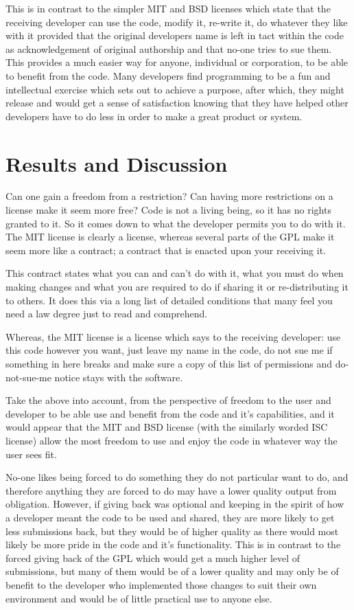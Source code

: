 This is in contrast to the simpler MIT and BSD licenses which state that the receiving developer can use the code, modify it, re-write it, do whatever they like with it provided that the original developers name is left in tact within the code as acknowledgement of original authorship and that no-one tries to sue them. This provides a much easier way for anyone, individual or corporation, to be able to benefit from the code. Many developers find programming to be a fun and intellectual exercise which sets out to achieve a purpose, after which, they might release and would get a sense of satisfaction knowing that they have helped other developers have to do less in order to make a great product or system.

\section{Results and Discussion}
Can one gain a freedom from a restriction? Can having more restrictions on a license make it seem more free? Code is not a living being, so it has no rights granted to it. So it comes down to what the developer permits you to do with it. The MIT license is clearly a license, whereas several parts of the GPL make it seem more like a contract; a contract that is enacted upon your receiving it.

This contract states what you can and can't do with it, what you must do when making changes and what you are required to do if sharing it or re-distributing it to others. It does this via a long list of detailed conditions that many feel you need a law degree just to read and comprehend.

Whereas, the MIT license is a license which says to the receiving developer: use this code however you want, just leave my name in the code, do not sue me if something in here breaks and make sure a copy of this list of permissions and do-not-sue-me notice stays with the software.

Take the above into account, from the perspective of freedom to the user and developer to be able use and benefit from the code and it's capabilities, and it would appear that the MIT and BSD license (with the similarly worded ISC license) allow the most freedom to use and enjoy the code in whatever way the user sees fit.

No-one likes being forced to do something they do not particular want to do, and therefore anything they are forced to do may have a lower quality output from obligation. However, if giving back was optional and keeping in the spirit of how a developer meant the code to be used and shared, they are more likely to get less submissions back, but they would be of higher quality as there would most likely be more pride in the code and it's functionality. This is in contrast to the forced giving back of the GPL which would get a much higher level of submissions, but many of them would be of a lower quality and may only be of benefit to the developer who implemented those changes to suit their own environment and would be of little practical use to anyone else.
